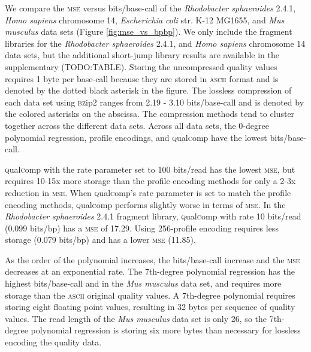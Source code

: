 We compare the \textsc{mse} versus bits/base-call of the
\textit{Rhodobacter sphaeroides} 2.4.1, \textit{Homo sapiens}
chromosome 14, \textit{Escherichia coli} str. K-12 MG1655, and
\textit{Mus musculus} data sets (Figure \ref{fig:mse_vs_bpbp}). We
only include the fragment libraries for the \textit{Rhodobacter
  sphaeroides} 2.4.1, and \textit{Homo sapiens} chromosome 14 data
sets, but the additional short-jump library results are available in
the supplementary (TODO:TABLE). Storing the uncompressed quality
values requires 1 byte per base-call because they are stored in
\textsc{ascii} format and is denoted by the dotted black asterisk in
the figure. The lossless compression of each data set using \textsc{bz}ip2
ranges from 2.19 - 3.10 bits/base-call and is denoted by the colored
asterisks on the abscissa. The compression methods tend to cluster
together across the different data sets. Across all data sets, the
0-degree polynomial regression, profile encodings, and \textsc{q}ual\textsc{c}omp have
the lowest bits/base-call.

\textsc{q}ual\textsc{c}omp with the rate parameter set to 100 bits/read has the lowest
\textsc{mse}, but requires 10-15x more storage than the profile
encoding methods for only a 2-3x reduction in \textsc{mse}. When
\textsc{q}ual\textsc{c}omp's rate parameter is set to match the profile encoding
methods, \textsc{q}ual\textsc{c}omp performs slightly worse in terms of \textsc{mse}.
In the \textit{Rhodobacter sphaeroides} 2.4.1 fragment library,
\textsc{q}ual\textsc{c}omp with rate 10 bits/read (0.099 bits/bp) has a \textsc{mse} of
17.29. Using 256-profile encoding requires less storage (0.079
bits/bp) and has a lower \textsc{mse} (11.85).

As the order of the polynomial increases, the bits/base-call increase
and the \textsc{mse} decreases at an exponential rate. The 7th-degree
polynomial regression has the highest bits/base-call and in the
\textit{Mus musculus} data set, and requires more storage than the
\textsc{ascii} original quality values. A 7th-degree polynomial
requires storing eight floating point values, resulting in 32 bytes
per sequence of quality values. The read length of the \textit{Mus musculus}
data set is only 26, so the 7th-degree polynomial regression is storing
six more bytes than necessary for lossless encoding the quality data.

